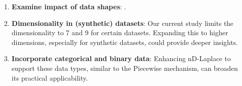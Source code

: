 \begin{enumerate}
\item \textbf{Examine impact of data shapes}: . 
\item \textbf{Dimensionality in (synthetic) datasets}: Our current study limits the dimensionality to 7 and 9 for certain datasets. Expanding this to higher dimensions, especially for synthetic datasets, could provide deeper insights. 
\item \textbf{Incorporate categorical and binary data}: Enhancing nD-Laplace to support these data types, similar to the Piecewise mechanism, can broaden its practical applicability. 
\end{enumerate}

